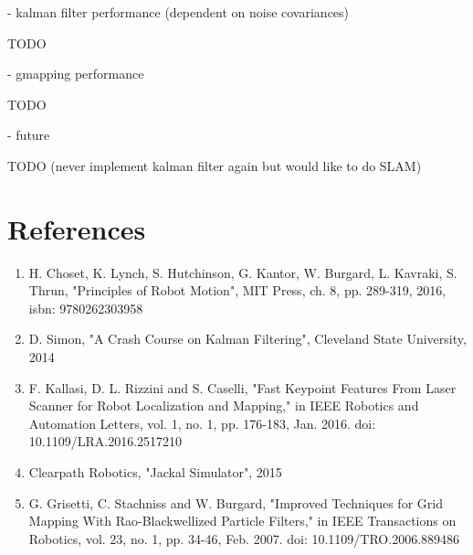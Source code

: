 \documentclass{article}
\begin{document}
- kalman filter performance (dependent on noise covariances)

TODO

- gmapping performance

TODO

- future

TODO (never implement kalman filter again but would like to do SLAM)

\section*{References}

\begin{enumerate}
    \item H. Choset, K. Lynch, S. Hutchinson, G. Kantor, W. Burgard, L. Kavraki, S. Thrun, "Principles of Robot Motion", MIT Press, ch. 8, pp. 289-319, 2016, isbn: 9780262303958
    
    \item D. Simon, "A Crash Course on Kalman Filtering", Cleveland State University, 2014
    
    \item F. Kallasi, D. L. Rizzini and S. Caselli, "Fast Keypoint Features From Laser Scanner for Robot Localization and Mapping," in IEEE Robotics and Automation Letters, vol. 1, no. 1, pp. 176-183, Jan. 2016.
doi: 10.1109/LRA.2016.2517210

    \item Clearpath Robotics, "Jackal Simulator", 2015
    
    \item G. Grisetti, C. Stachniss and W. Burgard, "Improved Techniques for Grid Mapping With Rao-Blackwellized Particle Filters," in IEEE Transactions on Robotics, vol. 23, no. 1, pp. 34-46, Feb. 2007.
doi: 10.1109/TRO.2006.889486
\end{enumerate}
\end{document}
